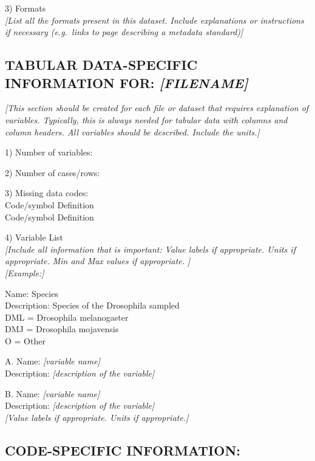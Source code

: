 \documentclass[]{article}
\begin{document}
3) Formats\\
\emph{{[}List all the formats present in this dataset. Include
explanations or instructions if necessary (e.g.~links to page describing
a metadata standard){]}}

\subsection{\texorpdfstring{TABULAR DATA-SPECIFIC INFORMATION FOR:
\emph{{[}FILENAME{]}}}{TABULAR DATA-SPECIFIC INFORMATION FOR: {[}FILENAME{]}}}\label{tabular-data-specific-information-for-filename}

\emph{{[}This section should be created for each file or dataset that
requires explanation of variables. Typically, this is always needed for
tabular data with columns and column headers. All variables should be
described. Include the units.{]}}

1) Number of variables:

2) Number of cases/rows:

3) Missing data codes:\\
Code/symbol Definition\\
Code/symbol Definition

4) Variable List\\
\emph{{[}Include all information that is important: Value labels if
appropriate. Units if appropriate. Min and Max values if appropriate.
{]}}\\
\emph{{[}Example:{]}}

Name: Species\\
Description: Species of the Drosophila sampled\\
DML = Drosophila melanogaster\\
DMJ = Drosophila mojavensis\\
O = Other

A. Name: \emph{{[}variable name{]}}\\
Description: \emph{{[}description of the variable{]}}

B. Name: \emph{{[}variable name{]}}\\
Description: \emph{{[}description of the variable{]}}\\
\emph{{[}Value labels if appropriate. Units if appropriate.{]}}

\subsection{CODE-SPECIFIC INFORMATION:}\label{code-specific-information}
\end{document}
